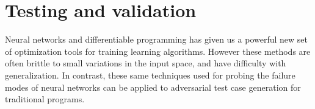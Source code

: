 \documentclass[12pt,initial,twoside,maitrise]{dms}
\numberwithin{equation}{section}
\numberwithin{table}{chapter}
\numberwithin{figure}{chapter}
\begin{document}
%
%

    \chapter*{Testing and validation}

    Neural networks and differentiable programming has given us a powerful new set of optimization tools for training learning algorithms. However these methods are often brittle to small variations in the input space, and have difficulty with generalization. In contrast, these same techniques used for probing the failure modes of neural networks can be applied to adversarial test case generation for traditional programs.
\end{document}
